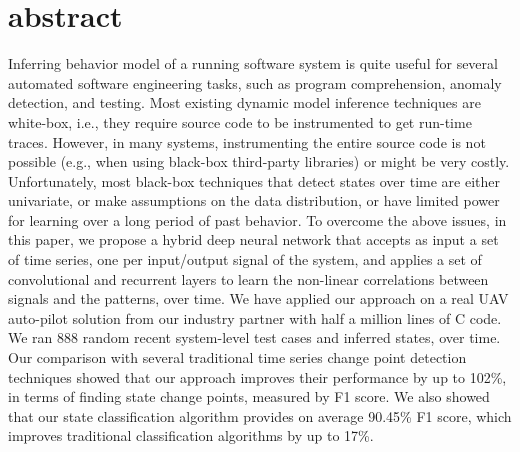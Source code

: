 \section{abstract}
Inferring behavior model of a running software system is quite useful for several automated software engineering tasks, such as program comprehension, anomaly detection, and testing. Most existing dynamic model inference techniques are white-box, i.e., they require source code to be instrumented to get run-time traces. However, in many systems, instrumenting the entire source code is not possible (e.g., when using black-box third-party libraries) or might be very costly. %
Unfortunately, most black-box techniques that detect states over time are either univariate, or make assumptions on the data distribution, or have limited power for learning over a long period of past behavior. To overcome the above issues, in this paper, we propose a hybrid deep neural network that accepts as input a set of time series, one per input/output signal of the system, and applies a set of convolutional and recurrent layers to learn the non-linear correlations between signals and the patterns, over time. We have applied our approach on a real UAV auto-pilot solution from our industry partner with half a million lines of C code. We ran 888 random recent system-level test cases and inferred states, over time. Our comparison with several traditional time series change point detection techniques showed that our approach improves their performance by up to 102\%, in terms of finding state change points, measured by F1 score. We also showed that our state classification algorithm provides on average 90.45\% F1 score, which improves traditional classification algorithms by up to 17\%.

